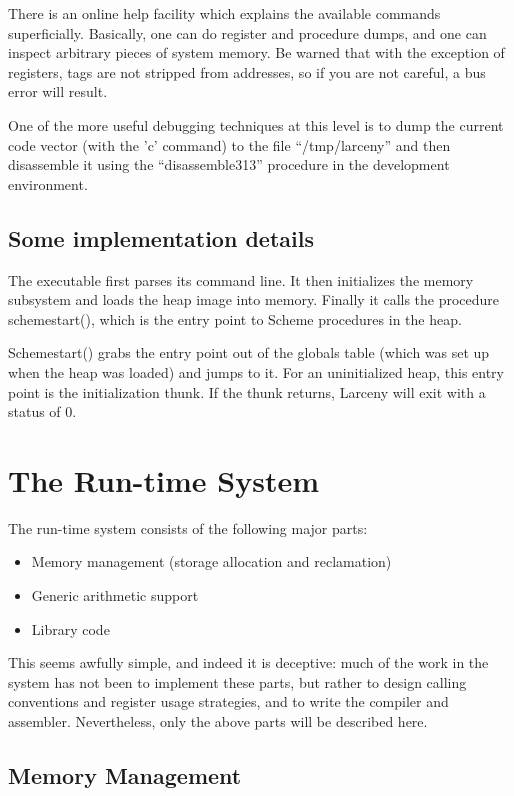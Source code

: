 There is an online help facility which explains the available commands 
superficially. Basically, one can do register and procedure dumps, and one
can inspect arbitrary pieces of system memory. Be warned that with the
exception of registers, tags are not stripped from addresses, so if 
you are not careful, a bus error will result.

One of the more useful debugging techniques at this level is to dump the
current code vector (with the 'c' command) to the file ``/tmp/larceny'' and
then disassemble it using the ``disassemble313'' procedure in the
development environment.

\subsection{Some implementation details}

The executable first parses its command line. It then initializes the memory
subsystem and loads the heap image into memory. Finally it calls the
procedure schemestart(), which is the entry point to Scheme procedures in
the heap.

Schemestart() grabs the entry point out of the globals table (which was set
up when the heap was loaded) and jumps to it. For an uninitialized heap,
this entry point is the initialization thunk. If the thunk returns,
Larceny will exit with a status of 0.

\section{The Run-time System}

The run-time system consists of the following major parts:

\begin{itemize}
\item Memory management (storage allocation and reclamation)
\item Generic arithmetic support
\item Library code
\end{itemize}

This seems awfully simple, and indeed it is deceptive: much of the
work in the system has not been to implement these parts, but rather
to design calling conventions and register usage strategies, and to
write the compiler and assembler. Nevertheless, only the above parts
will be described here.

\subsection{Memory Management}

